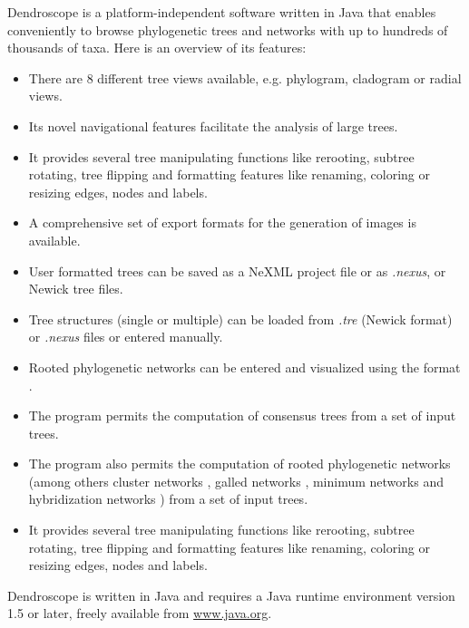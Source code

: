 \documentclass[11pt]{article}
\def\Dendroscope{{\sf Dendroscope }}
\begin{document}
\Dendroscope is a platform-independent software written in Java that enables conveniently to 
browse phylogenetic trees  and networks with up to hundreds of thousands of taxa.
Here is an overview of its features:
\begin{itemize}
\item There are 8 different tree views available, e.g. phylogram, cladogram or radial views.
\item Its novel navigational features facilitate the analysis of large trees.
\item It provides several tree manipulating functions like 
rerooting, subtree rotating, tree flipping and formatting features like renaming,
coloring or resizing edges, nodes and labels. 
\item A comprehensive set of export formats for the generation of images is available.
\item User formatted trees can be saved as a NeXML project file or as \textit{.nexus}, or Newick tree files. 
\item Tree structures (single or multiple) can be loaded from  \textit{.tre} (Newick format) or \textit{.nexus} files or entered manually.
\item Rooted phylogenetic networks can be entered and visualized using the  format \cite{Cardona2008}.
\item 
The program permits the computation of consensus trees  from a set of input trees.
\item The program also permits  the computation of rooted phylogenetic networks (among others cluster networks \cite{ClusterNetworks2008}, {galled networks} \cite{GalledNetworks2009}, {minimum networks} \cite{LevelKClusters2010} and hybridization networks  \cite{Albrecht2012,HusonLinz2012}) from a set of input trees.
\item It provides several tree manipulating functions like 
rerooting, subtree rotating, tree flipping and formatting features like renaming,
coloring or resizing edges, nodes and labels. 


\end{itemize}

\Dendroscope is written in Java and requires a Java runtime environment
version 1.5 or later, freely available from
\href{http://www.java.org}{www.java.org}. %
\end{document}
